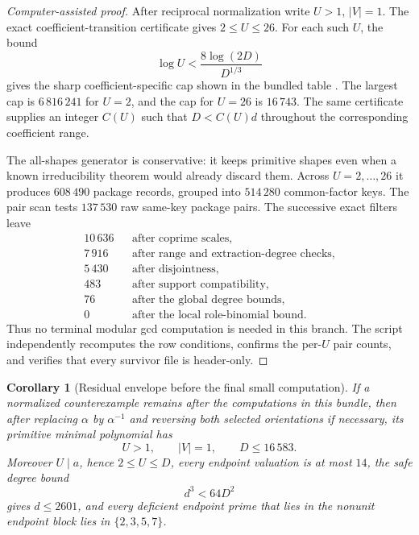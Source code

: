 \documentclass[11pt]{article}
\newtheorem{corollary}[theorem]{Corollary}
\theoremstyle{definition}
\begin{document}
\begin{proof}[Computer-assisted proof]
After reciprocal normalization write \(U>1\), \(|V|=1\).  The exact
coefficient-transition certificate gives \(2\leq U\leq26\).  For each such
\(U\), the bound
\[
 \log U<\frac{8\log(2D)}{D^{1/3}}
\]
gives the sharp coefficient-specific cap shown in the bundled table
.  The largest cap is
\(6\,816\,241\) for \(U=2\), and the cap for \(U=26\) is \(16\,743\).
The same certificate supplies an integer \(C(U)\) such that \(D<C(U)d\)
throughout the corresponding coefficient range.

The all-shapes generator is conservative: it keeps primitive shapes even
when a known irreducibility theorem would already discard them.  Across
\(U=2,\ldots,26\) it produces \(608\,490\) package records, grouped into
\(514\,280\) common-factor keys.  The pair scan tests \(137\,530\) raw
same-key package pairs.  The successive exact filters leave
\[
\begin{array}{rcl}
10\,636 && \text{after coprime scales},\\
 7\,916 && \text{after range and extraction-degree checks},\\
 5\,430 && \text{after disjointness},\\
   483 && \text{after support compatibility},\\
    76 && \text{after the global degree bounds},\\
     0 && \text{after the local role-binomial bound}.
\end{array}
\]
Thus no terminal modular gcd computation is needed in this branch.  The
script  independently recomputes the
row conditions, confirms the per-\(U\) pair counts, and verifies that every
survivor file is header-only.
\end{proof}

\begin{corollary}[Residual envelope before the final small computation]
\label{cor:q12residualenvelope}
If a normalized counterexample remains after the computations in this
bundle, then after replacing \(\alpha\) by \(\alpha^{-1}\) and reversing both
selected orientations if necessary, its primitive minimal polynomial has
\[
 U>1,
 \qquad |V|=1,
 \qquad D\leq16\,583.
\]
Moreover \(U\mid a\), hence \(2\leq U\leq D\), every endpoint valuation is at
most \(14\), the safe degree bound
\[
 d^3<64D^2
\]
gives \(d\leq2601\), and every deficient endpoint prime that lies in the
nonunit endpoint block lies in \(\{2,3,5,7\}\).
\end{corollary}
\end{document}
